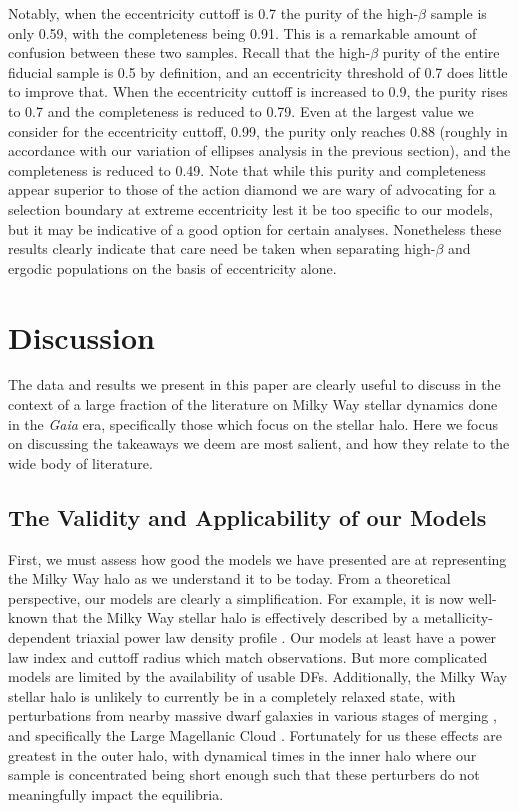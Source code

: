 Notably, when the eccentricity cuttoff is 0.7 the purity of the high-$\beta$ sample is only 0.59, with the completeness being 0.91. This is a remarkable amount of confusion between these two samples. Recall that the high-$\beta$ purity of the entire fiducial sample is 0.5 by definition, and an eccentricity threshold of 0.7 does little to improve that. When the eccentricity cuttoff is increased to 0.9, the purity rises to 0.7 and the completeness is reduced to 0.79. Even at the largest value we consider for the eccentricity cuttoff, 0.99, the purity only reaches 0.88 (roughly in accordance with our variation of ellipses analysis in the previous section), and the completeness is reduced to 0.49. Note that while this purity and completeness appear superior to those of the action diamond we are wary of advocating for a selection boundary at extreme eccentricity lest it be too specific to our models, but it may be indicative of a good option for certain analyses. Nonetheless these results clearly indicate that care need be taken when separating high-$\beta$ and ergodic populations on the basis of eccentricity alone.

\section{Discussion}
\label{sec:Discussion}

The data and results we present in this paper are clearly useful to discuss in the context of a large fraction of the literature on Milky Way stellar dynamics done in the \textit{Gaia} era, specifically those which focus on the stellar halo. Here we focus on discussing the takeaways we deem are most salient, and how they relate to the wide body of literature.

\subsection{The Validity and Applicability of our Models}

First, we must assess how good the models we have presented are at representing the Milky Way halo as we understand it to be today. From a theoretical perspective, our models are clearly a simplification. For example, it is now well-known that the Milky Way stellar halo is effectively described by a metallicity-dependent triaxial power law density profile \parencite[e.g.,][]{mackereth20}. Our models at least have a power law index and cuttoff radius which match observations. But more complicated models are limited by the availability of usable DFs. Additionally, the Milky Way stellar halo is unlikely to currently be in a completely relaxed state, with perturbations from nearby massive dwarf galaxies in various stages of merging \parencite{garrow20}, and specifically the Large Magellanic Cloud \parencite{erkal19}. Fortunately for us these effects are greatest in the outer halo, with dynamical times in the inner halo where our sample is concentrated being short enough such that these perturbers do not meaningfully impact the equilibria.

